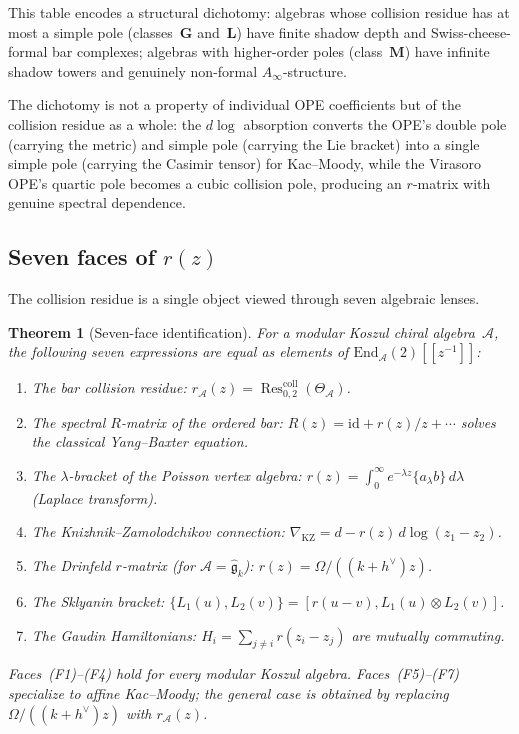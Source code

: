 \documentclass[11pt,reqno]{amsart}
\newtheorem{theorem}{Theorem}[section]
\theoremstyle{definition}
\theoremstyle{remark}
\newcommand{\cA}{\mathcal{A}}
\newcommand{\fg}{\mathfrak{g}}
\newcommand{\Res}{\operatorname{Res}}
\numberwithin{equation}{section}
\newcommand{\End}{\mathrm{End}}
\begin{document}
\noindent
This table encodes a structural dichotomy: algebras whose
collision residue has at most a simple pole (classes~$\mathbf{G}$
and~$\mathbf{L}$) have finite shadow depth and
Swiss-cheese-formal bar complexes; algebras with higher-order
poles (class~$\mathbf{M}$) have infinite shadow towers and
genuinely non-formal $A_\infty$-structure.

The dichotomy is not a property of individual OPE coefficients
but of the collision residue as a whole: the $d\log$ absorption
converts the OPE's double pole (carrying the metric) and simple
pole (carrying the Lie bracket) into a single simple pole
(carrying the Casimir tensor) for Kac--Moody, while the
Virasoro OPE's quartic pole becomes a cubic collision pole,
producing an $r$-matrix with genuine spectral dependence.

\subsection{Seven faces of $r(z)$}
\label{ssec:seven-faces}

The collision residue is a single object viewed through seven
algebraic lenses.

\begin{theorem}[Seven-face identification]
\label{thm:seven-faces}
For a modular Koszul chiral algebra~$\cA$, the following seven
expressions are equal as elements of\/
$\End_\cA(2)[\![z^{-1}]\!]$:
\begin{enumerate}[label=\textup{(F\arabic*)}]
\item The bar collision residue:
 $r_\cA(z)
 = \Res^{\mathrm{coll}}_{0,2}(\Theta_\cA)$.
\item The spectral $R$-matrix of the ordered bar:
 $R(z) = \mathrm{id} + r(z)/z + \cdots$ solves the
 classical Yang--Baxter equation.
\item The $\lambda$-bracket of the Poisson vertex algebra:
 $r(z) = \int_0^\infty e^{-\lambda z}
 \{a_\lambda b\}\,d\lambda$
 \textup{(}Laplace transform\textup{)}.
\item The Knizhnik--Zamolodchikov connection:
 $\nabla_{\mathrm{KZ}}
 = d - r(z)\,d\log(z_1 - z_2)$.
\item\label{it:drinfeld-face} The Drinfeld $r$-matrix
 \textup{(}for $\cA = \widehat{\fg}_k$\textup{)}:
 $r(z) = \Omega/((k+h^\vee)z)$.
\item The Sklyanin bracket:
 $\{L_1(u), L_2(v)\}
 = [r(u - v), L_1(u) \otimes L_2(v)]$.
\item The Gaudin Hamiltonians:
 $H_i
 = \sum_{j \ne i} r(z_i - z_j)$
 are mutually commuting.
\end{enumerate}
Faces~\textup{(F1)--(F4)} hold for every modular Koszul
algebra. Faces~\textup{(F5)--(F7)} specialize to affine
Kac--Moody; the general case is obtained by replacing
$\Omega/((k{+}h^\vee)z)$ with $r_\cA(z)$.
\end{theorem}
\end{document}
